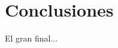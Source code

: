 \chapter{Conclusiones}

El gran final...

\lipsum[1]

\lipsum[2]

\lipsum[3]

\lipsum[4]

\lipsum[5]
